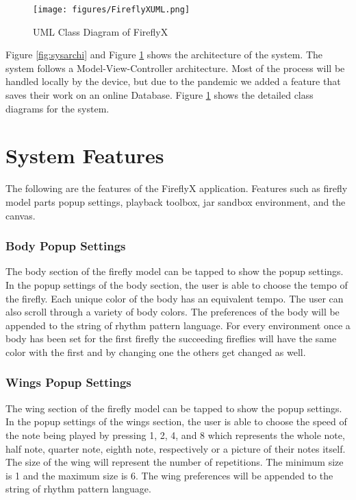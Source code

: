 \begin{figure} [H]
    \centering
    \texttt{[image: figures/FireflyXUML.png]}
    \caption{UML Class Diagram of FireflyX}
    \label{fig:fireflyxUML}
\end{figure}

Figure \ref{fig:sysarchi} and Figure \ref{fig:fireflyxUML} shows the architecture of the system. The system follows a Model-View-Controller architecture. Most of the process will be handled locally by the device, but due to the pandemic we added a feature that saves their work on an online Database. Figure \ref{fig:fireflyxUML} shows the detailed class diagrams for the system.
    
\section{System Features}
The following are the features of the FireflyX application. Features such as firefly model parts popup settings, playback toolbox, jar sandbox environment, and the canvas.


\subsubsection{Body Popup Settings}
The body section of the firefly model can be tapped to show the popup settings. In the popup settings of the body section, the user is able to choose the tempo of the firefly. Each unique color of the body has an equivalent tempo. The user can also scroll through a variety of body colors. The preferences of the body will be appended to the string of rhythm pattern language. For every environment once a body has been set for the first firefly the succeeding fireflies will have the same color with the first and by changing one the others get changed as well.

\subsubsection{Wings Popup Settings}
The wing section of the firefly model can be tapped to show the popup settings. In the popup settings of the wings section, the user is able to choose the speed of the note being played by pressing 1, 2, 4, and 8 which represents the whole note, half note, quarter note, eighth note, respectively or a picture of their notes itself. The size of the wing will represent the number of repetitions. The minimum size is 1 and the maximum size is 6. The wing preferences will be appended to the string of rhythm pattern language.

